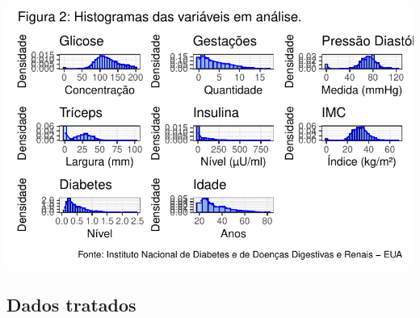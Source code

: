 \documentclass[
  letterpaper,
  DIV=11,
  numbers=noendperiod]{scrartcl}
\begin{document}
\includegraphics{relatorio_lab1_files/figure-pdf/unnamed-chunk-4-1.pdf}

\hypertarget{dados-tratados}{%
\subsection{Dados tratados}\label{dados-tratados}}
\end{document}
